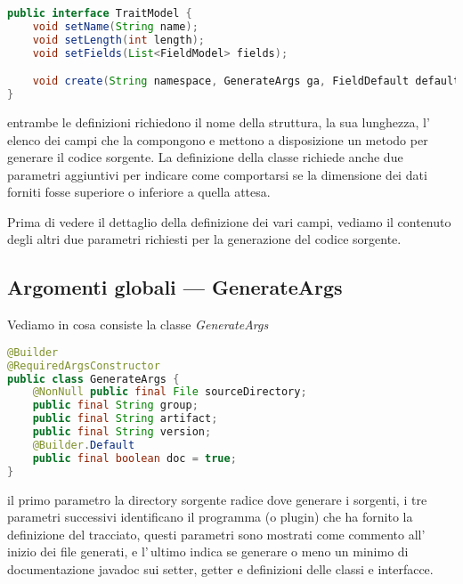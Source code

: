 \documentclass[a4paper,10pt]{report}
\begin{document}
\begin{lstlisting}[language=java, caption=interfaccia TraitModel, 
label=code:TraitModel]
public interface TraitModel {
    void setName(String name);
    void setLength(int length);
    void setFields(List<FieldModel> fields);

    void create(String namespace, GenerateArgs ga, FieldDefault defaults);
}
\end{lstlisting}
\noindent entrambe le definizioni richiedono il nome della struttura, la sua
lunghezza, l'\,elenco dei campi che la compongono e mettono a disposizione
un metodo per generare il codice sorgente.
La definizione della classe richiede anche due parametri aggiuntivi per indicare
come comportarsi se la dimensione dei dati forniti fosse superiore o inferiore a
quella attesa.

Prima di vedere il dettaglio della definizione dei vari campi, vediamo il 
contenuto degli altri due parametri richiesti per la generazione del codice
sorgente.

\subsection{Argomenti globali --- GenerateArgs}
Vediamo in cosa consiste la classe \textsl{GenerateArgs}

\begin{lstlisting}[language=java, caption=interfaccia GenerateArgs, 
label=code:GenerateArgs]
@Builder
@RequiredArgsConstructor
public class GenerateArgs {
    @NonNull public final File sourceDirectory;
    public final String group;
    public final String artifact;
    public final String version;
    @Builder.Default
    public final boolean doc = true;
}
\end{lstlisting}
il primo parametro la directory sorgente radice dove generare i sorgenti,
i tre parametri successivi identificano il programma (o plugin) che ha fornito
la definizione del tracciato, questi parametri sono mostrati come commento
all'\,inizio dei file generati, e l'\,ultimo indica se generare o meno un minimo
di documentazione javadoc sui setter, getter e definizioni delle classi e 
interfacce.
\end{document}
